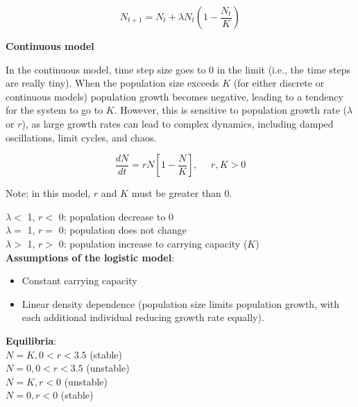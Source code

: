 \documentclass[12pt]{article}
\begin{document}
\begin{equation}
N_{t+1} = N_{t} + \lambda N_{t} (1 - \frac{N_t}{K})
\end{equation}






\bigskip


\textbf{Continuous model}

In the continuous model, time step size goes to 0 in the limit (i.e., the time steps are really tiny). When the population size exceeds $K$ (for either discrete or continuous models) population growth becomes negative, leading to a tendency for the system to go to $K$. However, this is sensitive to population growth rate ($\lambda$ or $r$), as large growth rates can lead to complex dynamics, including damped oscillations, limit cycles, and chaos. 


\begin{equation}
\frac{dN}{dt} = rN \left[1- \frac{N}{K}\right], \ \ \ \ \ \  r, K > 0
\end{equation}

Note: in this model, $r$ and $K$ must be greater than 0.

$\lambda <$ 1, $r <$ 0: population decrease to 0 \\
$\lambda =$ 1, $r =$ 0: population does not change \\
$\lambda >$ 1, $r >$ 0: population increase to carrying capacity ($K$) \\


\textbf{Assumptions of the logistic model}:

\begin{itemize}
  \item Constant carrying capacity
  \item Linear density dependence (population size limits population growth, with each additional individual reducing growth rate equally).

\end{itemize}




\textbf{Equilibria}:\\

$N = K, 0 < r < 3.5$ (stable) \\
$N = 0, 0 < r < 3.5$ (unstable) \\

$N = K, r < 0$ (unstable) \\
$N = 0, r < 0$ (stable) \\
\end{document}
